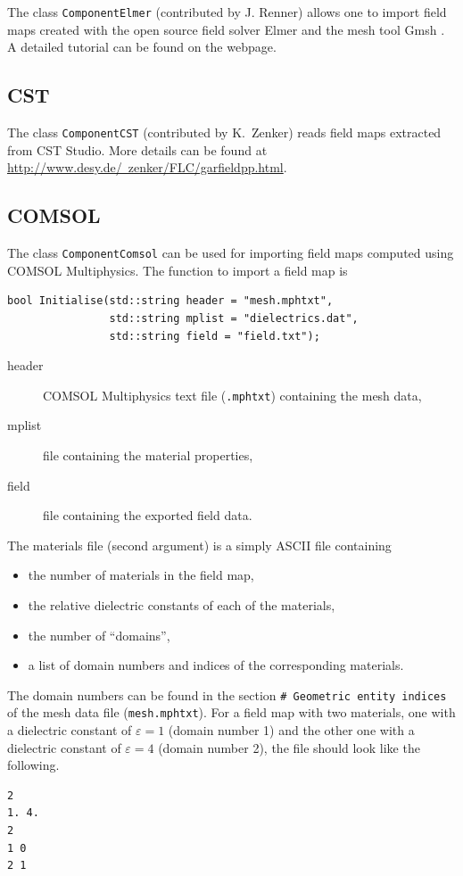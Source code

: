 The class \texttt{ComponentElmer} (contributed by J. Renner) allows one to import 
field maps created with the open source field solver Elmer \cite{Elmer}
and the mesh tool Gmsh \cite{Gmsh}. 
A detailed tutorial can be found on the webpage. 

\subsection{CST}

The class \texttt{ComponentCST} (contributed by K.~Zenker) reads field maps 
extracted from CST Studio. More details can be found at 
\href{http://www.desy.de/~zenker/FLC/garfieldpp.html}{http://www.desy.de/~zenker/FLC/garfieldpp.html}.

\subsection{COMSOL}

The class \texttt{ComponentComsol} can be used for 
importing field maps computed using COMSOL Multiphysics.
The function to import a field map is 
\begin{lstlisting}
bool Initialise(std::string header = "mesh.mphtxt",
                std::string mplist = "dielectrics.dat",
                std::string field = "field.txt");
\end{lstlisting}
\begin{description}
  \item[header] COMSOL Multiphysics text file (\texttt{.mphtxt}) containing the mesh data,
  \item[mplist] file containing the material properties, 
  \item[field] file containing the exported field data. 
\end{description}
The materials file (second argument) is a simply ASCII file containing
\begin{itemize}
  \item
  the number of materials in the field map, 
  \item
  the relative dielectric constants of each of the materials,
  \item
  the number of ``domains'',
  \item
  a list of domain numbers and indices of the corresponding materials.
\end{itemize}
The domain numbers can be found in the section 
\texttt{\# Geometric entity indices} of the mesh data file 
(\texttt{mesh.mphtxt}).
For a field map with two materials, 
one with a dielectric constant of $\varepsilon = 1$ (domain number 1) and 
the other one with a dielectric constant of $\varepsilon = 4$ 
(domain number 2), the file should look like the following.
\begin{lstlisting}
2
1. 4. 
2
1 0
2 1
\end{lstlisting}

